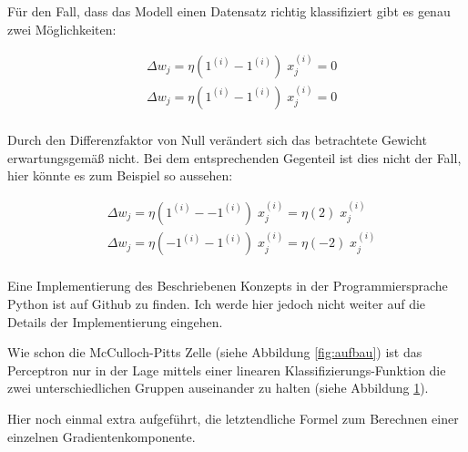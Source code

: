 Für den Fall, dass das Modell einen Datensatz richtig klassifiziert gibt es genau zwei Möglichkeiten: 

\begin{equation}
\begin{aligned}
& \Delta w_j = \eta(1^{(i)} - 1^{(i)})\;x^{(i)}_{j} = 0 \\
& \Delta w_j = \eta(1^{(i)} - 1^{(i)})\;x^{(i)}_{j} = 0 \\
\end{aligned}
\end{equation}

Durch den Differenzfaktor von Null verändert sich das betrachtete Gewicht erwartungsgemäß nicht. Bei dem entsprechenden Gegenteil ist dies nicht der Fall, hier könnte es zum Beispiel so aussehen: 

\begin{equation}
\begin{aligned}
& \Delta w_j = \eta(1^{(i)} - -1^{(i)})\;x^{(i)}_{j} = \eta(2)\;x^{(i)}_{j} \\
& \Delta w_j = \eta(-1^{(i)} - 1^{(i)})\;x^{(i)}_{j} = \eta(-2)\;x^{(i)}_{j} \\
\end{aligned}
\end{equation}

Eine Implementierung des Beschriebenen Konzepts in der Programmiersprache Python ist auf Github \cite{pcImplementierung} zu finden. Ich werde hier jedoch nicht weiter auf die Details der Implementierung eingehen. 

Wie schon die McCulloch-Pitts Zelle (siehe Abbildung \ref{fig:aufbau}) ist das Perceptron nur in der Lage mittels einer linearen Klassifizierungs-Funktion die zwei unterschiedlichen Gruppen auseinander zu halten (siehe Abbildung \ref{fig:probKlassi}).

Hier noch einmal extra aufgeführt, die letztendliche Formel zum Berechnen einer einzelnen Gradientenkomponente.
\begin{figure}
  \centering
  \qquad
  \label{fig:probKlassi}
\end{figure}

